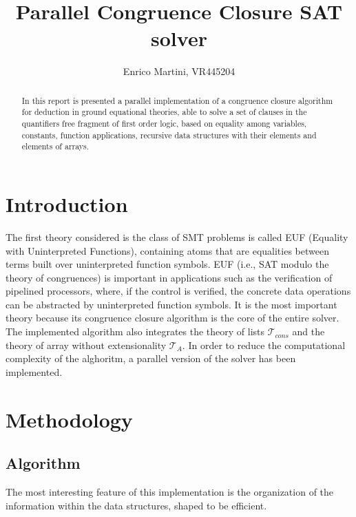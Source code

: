 \documentclass{IEEEtran}
\begin{document}
\title{Parallel Congruence Closure SAT solver}
\author{Enrico Martini, VR445204}
\maketitle
\begin{abstract}
 In this report is presented a parallel implementation of a congruence closure algorithm for deduction in ground equational theories, able to solve a set of clauses in the quantifiers free fragment of first order logic, based on equality among variables, constants, function applications, recursive data structures with their elements and elements of arrays.
\end{abstract}
\section{Introduction}
The first theory considered is the class of SMT problems is called EUF (Equality with Uninterpreted Functions), containing atoms that are equalities between terms built over uninterpreted function symbols. EUF (i.e., SAT modulo the theory of congruences) is important in applications such as the verification of pipelined processors, where, if the control is verified, the concrete data operations can be abstracted by uninterpreted function symbols.\cite{NIEUWENHUIS2007557} It is the most important theory because its congruence closure algorithm is the core of the entire solver. The implemented algorithm also integrates the theory of lists $\mathcal{T}_{cons}$ and the theory of array without extensionality $\mathcal{T}_A$. In order to reduce the computational complexity of the alghoritm, a parallel version of the solver has been implemented.
\section{Methodology}
\subsection{Algorithm}
The most interesting feature of this implementation is the organization of the information within the data structures, shaped to be efficient.
\end{document}
